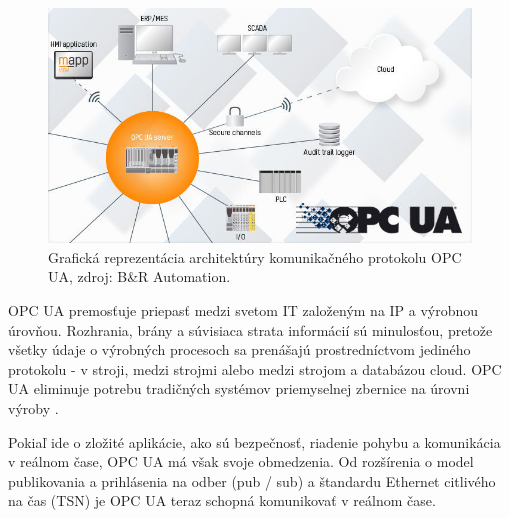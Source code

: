 \documentclass[]{tukediphc}
\begin{document}
\begin{figure}[h!]
	\centering
	\includegraphics[width=.9\textwidth,angle=0]{figures/opc-ua.jpg}
	\caption{Grafická reprezentácia architektúry komunikačného protokolu OPC UA, zdroj: B\&R Automation.}
\end{figure}


OPC UA premosťuje priepasť medzi svetom IT založeným na IP a výrobnou úrovňou. Rozhrania, brány a súvisiaca strata informácií sú minulosťou, pretože všetky údaje o výrobných procesoch sa prenášajú prostredníctvom jediného protokolu - v stroji, medzi strojmi alebo medzi strojom a databázou cloud. OPC UA eliminuje potrebu tradičných systémov priemyselnej zbernice na úrovni výroby \citep{brautomation}.


Pokiaľ ide o zložité aplikácie, ako sú bezpečnosť, riadenie pohybu a komunikácia v reálnom čase, OPC UA má však svoje obmedzenia. Od rozšírenia o model publikovania a prihlásenia na odber (pub / sub) a štandardu Ethernet citlivého na čas (TSN) je OPC UA teraz schopná komunikovať v reálnom čase.
\end{document}
